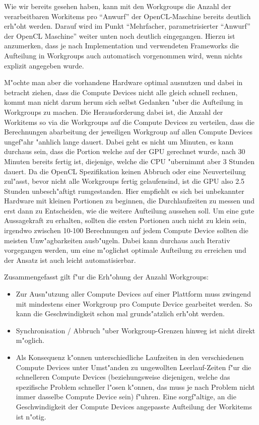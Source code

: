\begin{refsection}
Wie wir bereits gesehen haben, kann mit den Workgroups die Anzahl der 
verarbeitbaren Workitems  pro ``Anwurf'' der OpenCL-Maschine bereits
deutlich erh"oht werden. Darauf wird im Punkt ``Mehrfacher, parametrisierter
``Anwurf'' der OpenCL Maschine'' weiter unten noch deutlich eingegangen. 
Hierzu ist anzumerken, dass je nach Implementation und 
verwendeten Frameworks die Aufteilung in Workgroups auch automatisch
vorgenommen wird, wenn nichts explizit angegeben wurde.

M"ochte man aber die vorhandene Hardware optimal ausnutzen und dabei
in betracht ziehen, dass die Compute Devices nicht alle gleich schnell
rechnen, kommt man nicht darum herum sich selbst Gedanken "uber die
Aufteilung in Workgroups zu machen. Die Herausforderung dabei ist, 
die Anzahl der Workitems so via die Workgroups auf die Compute Devices
zu verteilen, dass die Berechnungen abarbeitung der jeweiligen Workgroup
auf allen Compute Devices ungef"ahr "anhlich lange dauert. Dabei geht es 
nicht um Minuten, es kann durchaus sein, dass 
die Portion welche auf der GPU gerechnet wurde, nach 30 Minuten bereits
fertig ist, diejenige, welche die CPU "ubernimmt aber 3 Stunden dauert.
Da die OpenCL Spezifikation keinen Abbruch oder eine Neuverteilung zul"asst,
bevor nicht alle Workgroups fertig gelaufensind, ist die GPU also 2.5 Stunden 
unbesch"aftigt rumgestanden. Hier empfiehlt es sich bei unbekannter Hardware 
mit kleinen Portionen zu beginnen, die Durchlaufzeiten zu messen und erst dann 
zu Entscheiden, wie die weitere Aufteilung aussehen soll. Um eine gute 
Aussagekraft zu erhalten, sollten die ersten Portionen auch nicht zu klein sein,
irgendwo zwischen 10-100 Berechnungen auf jedem Compute Device sollten die meisten 
Unw"agbarkeiten ausb"ugeln. Dabei kann durchaus auch Iterativ vorgegangen 
werden, um eine m"oglichst optimale Aufteilung zu erreichen und der Ansatz ist
auch leicht automatisierbar.

Zusammengefasst gilt f"ur die Erh"ohung der Anzahl Workgroups:

\begin{itemize}
 \item Zur Ausn"utzung aller Compute Devices auf einer Plattform
       muss zwingend mit mindestens einer Workgroup pro Compute Device
       gearbeitet werden. So kann die Geschwindigkeit schon mal 
       grunds"atzlich erh"oht werden.
 \item Synchronisation / Abbruch "uber Workgroup-Grenzen hinweg ist 
       nicht direkt m"oglich.
 \item Als Konsequenz k"onnen unterschiedliche Laufzeiten in den 
       verschiedenen Compute Devices unter Umst"anden zu 
       ungewollten Leerlauf-Zeiten f"ur die schnelleren Compute Devices 
       (beziehungsweise diejenigen, welche das spezifische Problem 
       schneller l"osen k"onnen, das muss je nach Problem nicht immer
       dasselbe Compute Device sein)
       f"uhren. Eine sorgf"altige, an die Geschwindigkeit der 
       Compute Devices angepasste Aufteilung der Workitems ist n"otig.
\end{itemize}




\end{refsection}
